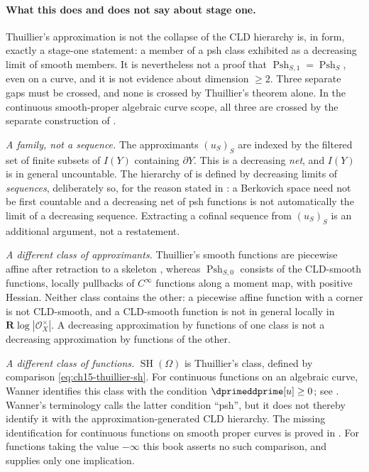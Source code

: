 \paragraph{What this does and does not say about stage one.}

\begin{warning}{Thuillier's approximation is not the collapse of the CLD
hierarchy}
 is, in form, exactly a stage-one
statement: a member of a psh class exhibited as a decreasing limit of smooth
members.  It is nevertheless not a proof that
$\operatorname{Psh}_{S,1}=\operatorname{Psh}_S$, even on a curve, and it is
not evidence about dimension $\ge2$.  Three separate gaps must be crossed,
and none is crossed by Thuillier's theorem alone.  In the continuous
smooth-proper algebraic curve scope, all three are crossed by the separate
construction of .

\emph{A family, not a sequence.}  The approximants $(u_S)_S$ are indexed by
the filtered set of finite subsets of $I(Y)$ containing $\partial Y$.  This
is a decreasing \emph{net}, and $I(Y)$ is in general uncountable.  The
hierarchy of  is defined by decreasing limits of
\emph{sequences}, deliberately so, for the reason stated in
: a Berkovich space need not be first countable and a
decreasing net of psh functions is not automatically the limit of a
decreasing sequence.  Extracting a cofinal sequence from $(u_S)_S$ is an
additional argument, not a restatement.

\emph{A different class of approximants.}  Thuillier's smooth functions are
piecewise affine after retraction to a skeleton
\cite[Proposition~3.2.4]{Thu05}, whereas
$\operatorname{Psh}_{S,0}$ consists of the CLD-smooth functions, locally
pullbacks of $C^\infty$ functions along a moment map, with positive Hessian.
Neither class contains the other: a piecewise affine function with a corner
is not CLD-smooth, and a CLD-smooth function is not in general locally in
$\mathbf R\log|\mathcal O_X^\times|$.  A decreasing approximation by
functions of one class is not a decreasing approximation by functions of the
other.

\emph{A different class of functions.}  $\operatorname{SH}(\Omega)$ is Thuillier's class,
defined by comparison \eqref{eq:ch15-thuillier-sh}.  For continuous functions
on an algebraic curve, Wanner identifies this class with the condition
$\dprimeddprime[u]\ge0$; see .  Wanner's
terminology calls the latter condition ``psh'', but it does not thereby
identify it with the approximation-generated CLD hierarchy.  The missing
identification for continuous functions on smooth proper curves is proved in
.  For functions taking
the value $-\infty$ this book asserts no such
comparison, and  supplies only one implication.


\end{warning}

